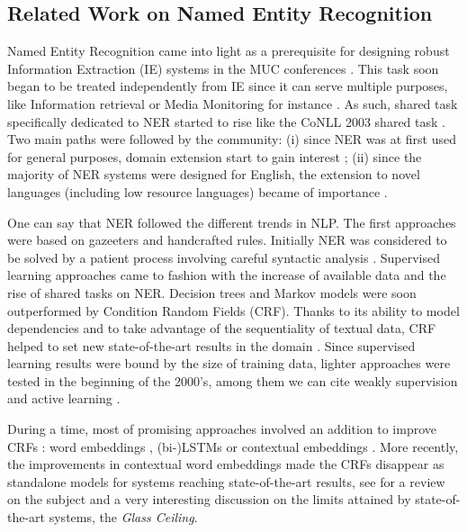 \subsection{Related Work on Named Entity Recognition}
\label{sec:sota}

Named Entity Recognition came into light as a prerequisite for designing robust Information Extraction (IE) systems in the MUC conferences \cite{grishman-sundheim-1995-design}. This task soon began to be treated independently from IE since it can serve multiple purposes, like Information retrieval or Media Monitoring for instance \cite{yangarber-etal-2002-unsupervised}. As such, shared task specifically dedicated to NER started to rise like the CoNLL 2003 shared task \cite{tjong-kim-sang-de-meulder-2003-introduction}. Two main paths were followed by the community: (i) since NER was at first used for general purposes, domain extension start to gain interest \cite{evans-2003-a}; (ii) since the majority of NER systems were designed for English, the extension to novel languages (including low resource languages) became of importance \cite{rossler-2004-adapting}.

One can say that NER followed the different trends in NLP. The first approaches were based on gazeeters and handcrafted rules. Initially NER was considered to be solved by a patient process involving careful syntactic analysis \cite{hobbs-1993-generic}. Supervised learning approaches came to fashion with the increase of available data and the rise of shared tasks on NER. Decision trees and Markov models were soon outperformed by Condition Random Fields (CRF).
Thanks to its ability to model dependencies and to take advantage of the sequentiality of textual data, CRF helped to set new state-of-the-art results in the domain \cite{finkel-etal-2005-incorporating}.
Since supervised learning results were bound by the size of training data, lighter approaches were tested in the beginning of the 2000's, among them we can cite weakly supervision \cite{yangarber-2003-counter} and active learning \cite{shen-etal-2004-multi}.

During a time, most of promising approaches involved an addition to improve CRFs : word embeddings \cite{passos-etal-2014-lexicon}, (bi-)LSTMs \cite{lample-etal-2016-neural} %
or contextual embeddings \cite{peters-etal-2018-deep}.
More recently, the improvements in contextual word embeddings made the CRFs disappear as standalone models for systems reaching state-of-the-art results, see \cite{stanislawek-etal-2019-named} for a review on the subject and a very interesting discussion on the limits attained by state-of-the-art systems, the \textit{Glass Ceiling}.

